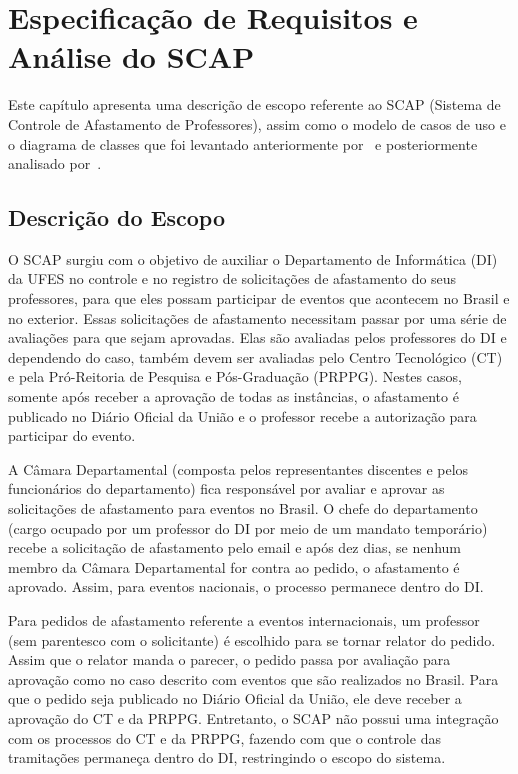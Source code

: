 \chapter{Especificação de Requisitos e Análise do SCAP}
\label{sec-requisitos}

Este capítulo apresenta uma descrição de escopo referente ao SCAP (Sistema de Controle de Afastamento de Professores), assim como o modelo de casos de uso e o diagrama de classes que foi levantado anteriormente por~ e posteriormente analisado por~. 

\section{Descrição do Escopo}
\label{sec-requisitos-descricao-escopo}

O SCAP surgiu com o objetivo de auxiliar o Departamento de Informática (DI) da UFES no controle e no registro de solicitações de afastamento do seus professores, para que eles possam participar de eventos que acontecem no Brasil e no exterior. Essas solicitações de afastamento necessitam passar por uma série de avaliações para que sejam aprovadas. Elas são avaliadas pelos professores do DI e dependendo do caso, também devem ser avaliadas pelo Centro Tecnológico (CT) e pela Pró-Reitoria de Pesquisa e Pós-Graduação (PRPPG). Nestes casos, somente após receber a aprovação de todas as instâncias, o afastamento é publicado no Diário Oficial da União e o professor recebe a autorização para participar do evento.     

A Câmara Departamental (composta pelos representantes discentes e pelos funcionários do departamento) fica responsável por avaliar e aprovar as solicitações de afastamento para eventos no Brasil. O chefe do departamento (cargo ocupado por um professor do DI por meio de um mandato temporário) recebe a solicitação de afastamento pelo email e após dez dias, se nenhum membro da Câmara Departamental for contra ao pedido, o afastamento é aprovado. Assim, para eventos nacionais, o processo permanece dentro do DI.

Para pedidos de afastamento referente a eventos internacionais, um professor (sem parentesco com o solicitante) é escolhido para se tornar relator do pedido. Assim que o relator manda o parecer, o pedido passa por avaliação para aprovação como no caso descrito com eventos que são realizados no Brasil. Para que o pedido seja publicado no Diário Oficial da União, ele deve receber a aprovação do CT e da PRPPG. Entretanto, o SCAP não possui uma integração com os processos do CT e da PRPPG, fazendo com que o controle das tramitações permaneça dentro do DI, restringindo o escopo do sistema.

